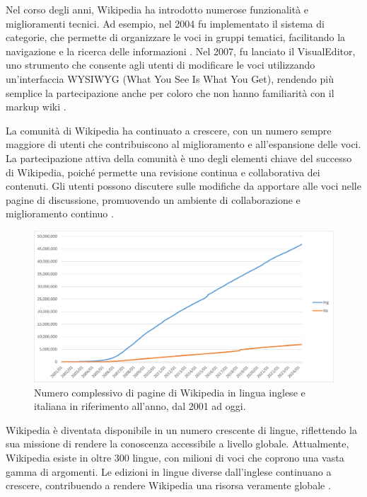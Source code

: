 \documentclass[12pt,a4paper]{report}
\begin{document}
Nel corso degli anni, Wikipedia ha introdotto numerose funzionalità e miglioramenti tecnici. Ad esempio, nel 2004 fu implementato il sistema di categorie, che permette di organizzare le voci in gruppi tematici, facilitando la navigazione e la ricerca delle informazioni \cite{jemielniak2014wikipedia}. Nel 2007, fu lanciato il VisualEditor, uno strumento che consente agli utenti di modificare le voci utilizzando un'interfaccia WYSIWYG (What You See Is What You Get), rendendo più semplice la partecipazione anche per coloro che non hanno familiarità con il markup wiki \cite{history_of_wikis}.

La comunità di Wikipedia ha continuato a crescere, con un numero sempre maggiore di utenti che contribuiscono al miglioramento e all'espansione delle voci. La partecipazione attiva della comunità è uno degli elementi chiave del successo di Wikipedia, poiché permette una revisione continua e collaborativa dei contenuti. Gli utenti possono discutere sulle modifiche da apportare alle voci nelle pagine di discussione, promuovendo un ambiente di collaborazione e miglioramento continuo \cite{denning2005wikipedia}.

\begin{figure}
    \includegraphics[width=\linewidth]{Immagini/Grafico pagine wikipedia excel.png}
    \caption{Numero complessivo di pagine di Wikipedia in lingua inglese e italiana in riferimento all'anno, dal 2001 ad oggi.\cite{wikimedia_stats} }
    \captionsetup{width=.8\linewidth}
    \label{fig:wikiPagesYear}
\end{figure}

Wikipedia è diventata disponibile in un numero crescente di lingue, riflettendo la sua missione di rendere la conoscenza accessibile a livello globale. Attualmente, Wikipedia esiste in oltre 300 lingue, con milioni di voci che coprono una vasta gamma di argomenti. Le edizioni in lingue diverse dall'inglese continuano a crescere, contribuendo a rendere Wikipedia una risorsa veramente globale \cite{reagle2010good}.
\end{document}
